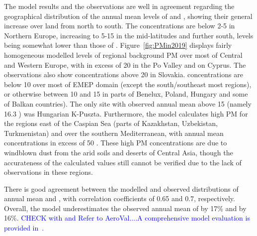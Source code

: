 The model results and the observations are well in agreement
regarding the geographical distribution of the annual mean levels of
\PM[10] and \PM[2.5], showing their general increase over land from
north to south. The concentrations are below 2-5 \ug in Northern
Europe, increasing to 5-15 \ug in the mid-latitudes and further south,
\PM[2.5] levels being somewhat lower than those of
\PM[10]. Figure~\ref{fig:PMin2019} displays fairly homogeneous modelled levels of regional background PM over most of Central and Western Europe,
with \PM[10] in excess of 20 \ug in the Po Valley and on Cyprus. The observations also show \PM[10] concentrations above 20 \ug in Slovakia. \PM[2.5] concentrations are below 10 \ug over most of EMEP domain (except the south/southeast most regions), or otherwise between 10 and 15 \ug in  parts of Benelux, Poland, Hungary and some of Balkan countries). The only site with observed annual mean \PM[10] above 15 \ug (namely 16.3 \ug) was Hungarian K-Puszta. Furthermore, the model calculates high PM for the regions east of the Caspian Sea (parts of Kazakhstan, Uzbekistan, Turkmenistan) and over the southern Mediterranean, with annual mean concentrations in excess of 50 \ug. These high PM concentrations are due to windblown dust from the arid soils and deserts of Central Asia, though the accurateness of the calculated values still cannot be verified due to the lack of observations in these regions.

There is good agreement between the modelled and observed
distributions of annual mean \PM[10] and \PM[2.5], with correlation
coefficients of 0.65 and 0.7, respectively. Overall, the model
underestimates the observed annual mean of \PM[10] by 17\% and
\PM[2.5] by 16\%. \textcolor{blue}{CHECK with and Refer to AeroVal....A comprehensive model evaluation is provided in~\cite{WEB2020:PM}.}

